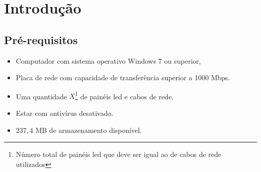 \documentclass[12pt, a4paper]{article}
\begin{document}
\section{Introdução}\label{Introdução}
\subsection{Pré-requisitos}\label{Pré-requisitos}
\begin{itemize}
	\item Computador com sistema operativo Windows 7 ou superior,	
	\item Placa de rede com capacidade de transferência superior a 1000 Mbps.
	\item Uma quantidade $X$\footnote{Número total de painéis led que deve ser igual ao de cabos de rede utilizados} de painéis led e cabos de rede.
	\item Estar com antivírus desativado.
	\item $237,4$ MB de armazenamento disponível.
\end{itemize}
\end{document}

